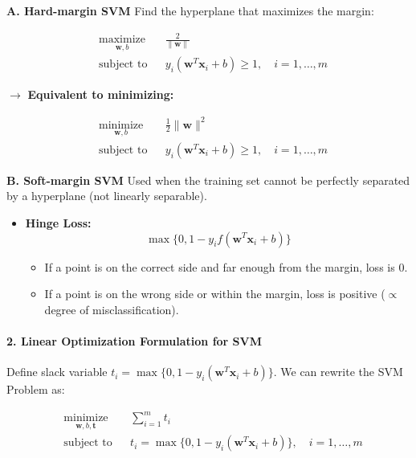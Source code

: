 \documentclass[11pt,a4paper]{article}
\providecommand{\tightlist}{\setlength{\itemsep}{0pt}\setlength{\parskip}{0pt}}
\begin{document}
\textbf{A. Hard-margin SVM} Find the hyperplane that maximizes the margin:

\[
\begin{aligned}
& \underset{\boldsymbol{w}, b}{\text{maximize}} & & \frac{2}{\|\boldsymbol{w}\|} \\
& \text{subject to} & & y_i (\boldsymbol{w}^T \boldsymbol{x}_i + b) \geq 1, \quad i = 1, \dots, m
\end{aligned}
\]

\(\rightarrow\) \textbf{Equivalent to minimizing:}

\[
\begin{aligned}
& \underset{\boldsymbol{w}, b}{\text{minimize}} & & \frac{1}{2} \|\boldsymbol{w}\|^2 \\
& \text{subject to} & & y_i (\boldsymbol{w}^T \boldsymbol{x}_i + b) \geq 1, \quad i = 1, \dots, m
\end{aligned}
\]

\textbf{B. Soft-margin SVM} Used when the training set cannot be perfectly separated by a hyperplane (not linearly separable).

\begin{itemize}
\tightlist
\item
  \textbf{Hinge Loss:} \[\max\{0, 1 - y_i f(\boldsymbol{w}^T \boldsymbol{x}_i + b)\}\]

  \begin{itemize}
  \tightlist
  \item
    If a point is on the correct side and far enough from the margin, loss is 0.
  \item
    If a point is on the wrong side or within the margin, loss is positive (\(\propto\) degree of misclassification).
  \end{itemize}
\end{itemize}

\paragraph{2. Linear Optimization Formulation for SVM}\label{linear-optimization-formulation-for-svm}

Define slack variable \(t_i = \max\{0, 1 - y_i (\boldsymbol{w}^T \boldsymbol{x}_i + b)\}\). We can rewrite the SVM Problem as:

\[
\begin{aligned}
& \underset{\boldsymbol{w}, b, \boldsymbol{t}}{\text{minimize}} & & \sum_{i=1}^m t_i \\
& \text{subject to} & & t_i = \max\{0, 1 - y_i (\boldsymbol{w}^T \boldsymbol{x}_i + b)\}, \quad i = 1, \dots, m
\end{aligned}
\]
\end{document}
